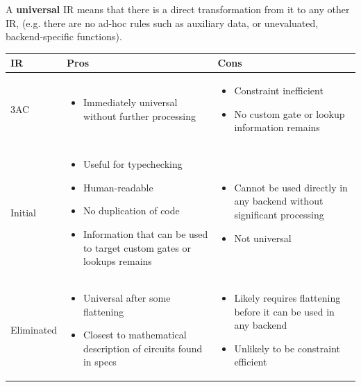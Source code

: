 \documentclass[
    9pt,            %
    techreport,        %
    affiltop,       %
]{art}
\begin{document}
A \textbf{universal} IR means that there is a direct transformation from it to any other IR, (e.g. there are no ad-hoc rules such as auxiliary data, or unevaluated, backend-specific functions).

\begin{tabular}{p{3cm}|p{5cm}|p{5cm}}
     IR & Pros & Cons \\
     \hline
    \vfill 3AC &
    \begin{itemize} \setlength{\itemindent}{-1.5em}
        \item Immediately universal without further processing
    \end{itemize} & 
    \begin{itemize} \setlength{\itemindent}{-1.5em}
        \item Constraint inefficient
        \item No custom gate or lookup information remains
    \end{itemize}
    \\
    \hline
    \vfill Initial &
    \begin{itemize} \setlength{\itemindent}{-1.5em}
        \item Useful for typechecking
        \item Human-readable
        \item No duplication of code
        \item Information that can be used to target custom gates or lookups remains
    \end{itemize} &
    \begin{itemize} \setlength{\itemindent}{-1.5em}
        \item Cannot be used directly in any backend without significant processing
        \item Not universal
    \end{itemize}
    \\
    \hline
    \vfill Eliminated &
    \begin{itemize} \setlength{\itemindent}{-1.5em}
        \item Universal after some flattening
        \item Closest to mathematical description of circuits found in specs
    \end{itemize} &
    \begin{itemize} \setlength{\itemindent}{-1.5em}
        \item Likely requires flattening before it can be used in any backend
        \item Unlikely to be constraint efficient

\end{itemize}
\end{tabular}
\end{document}
